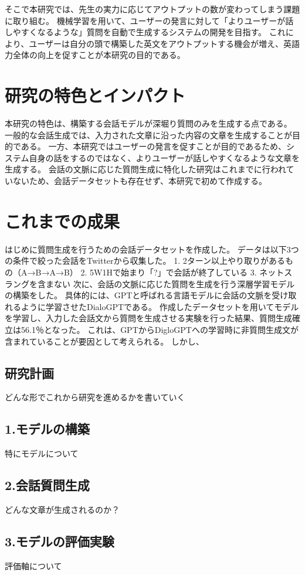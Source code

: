 \documentclass[a4paper,12pt]{jsarticle}
\begin{document}
\begin{framed}
  そこで本研究では、先生の実力に応じてアウトプットの数が変わってしまう課題に取り組む。
  機械学習を用いて、ユーザーの発言に対して「よりユーザーが話しやすくなるような」質問を自動で生成するシステムの開発を目指す。
  これにより、ユーザーは自分の頭で構築した英文をアウトプットする機会が増え、英語力全体の向上を促すことが本研究の目的である。

  \section*{研究の特色とインパクト}
  本研究の特色は、構築する会話モデルが深堀り質問のみを生成する点である。
  一般的な会話生成では、入力された文章に沿った内容の文章を生成することが目的である。
  一方、本研究ではユーザーの発言を促すことが目的であるため、システム自身の話をするのではなく、よりユーザーが話しやすくなるような文章を生成する。
  会話の文脈に応じた質問生成に特化した研究はこれまでに行われていないため、会話データセットも存在せず、本研究で初めて作成する。

  \section*{これまでの成果}
  はじめに質問生成を行うための会話データセットを作成した。
  データは以下3つの条件で絞った会話をTwitterから収集した。
  1. 2ターン以上やり取りがあるもの（A→B→A→B）
  2. 5W1Hで始まり「?」で会話が終了している
  3. ネットスラングを含まない
  次に、会話の文脈に応じた質問を生成を行う深層学習モデルの構築をした。
  具体的には、GPTと呼ばれる言語モデルに会話の文脈を受け取れるように学習させたDialoGPTである。
  作成したデータセットを用いてモデルを学習し、入力した会話文から質問を生成させる実験を行った結果、質問生成確立は56.1％となった。
  これは、GPTからDigloGPTへの学習時に非質問生成文が含まれていることが要因として考えられる。
  しかし、
  \end{framed}

  \newpage
  \begin{framed}
  \section*{研究計画}
  どんな形でこれから研究を進めるかを書いていく
  \subsection*{1.モデルの構築}
  特にモデルについて
  \subsection*{2.会話質問生成}
  どんな文章が生成されるのか？
  \subsection*{3.モデルの評価実験}
  評価軸について
  \end{framed}
\end{document}
